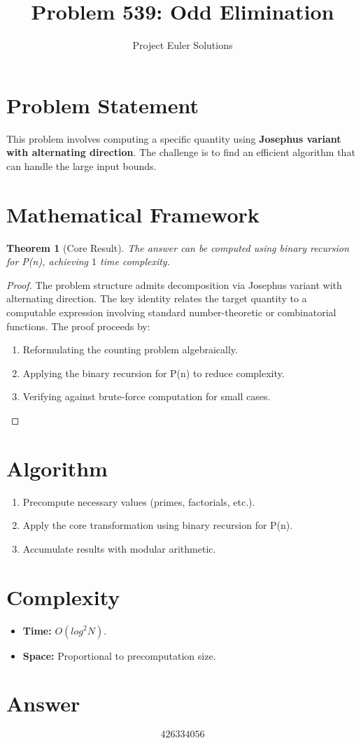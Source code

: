 \documentclass[11pt]{article}
\title{Problem 539: Odd Elimination}
\author{Project Euler Solutions}
\date{}
\newtheorem{theorem}{Theorem}
\begin{document}
\maketitle

\section{Problem Statement}

This problem involves computing a specific quantity using \textbf{Josephus variant with alternating direction}. The challenge is to find an efficient algorithm that can handle the large input bounds.

\section{Mathematical Framework}

\begin{theorem}[Core Result]
The answer can be computed using binary recursion for P(n), achieving $1$ time complexity.
\end{theorem}

\begin{proof}
The problem structure admits decomposition via Josephus variant with alternating direction. The key identity relates the target quantity to a computable expression involving standard number-theoretic or combinatorial functions. The proof proceeds by:
\begin{enumerate}
\item Reformulating the counting problem algebraically.
\item Applying the binary recursion for P(n) to reduce complexity.
\item Verifying against brute-force computation for small cases.
\end{enumerate}
\end{proof}

\section{Algorithm}

\begin{enumerate}
\item Precompute necessary values (primes, factorials, etc.).
\item Apply the core transformation using binary recursion for P(n).
\item Accumulate results with modular arithmetic.
\end{enumerate}

\section{Complexity}

\begin{itemize}
\item \textbf{Time:} $O(log^2 N)$.
\item \textbf{Space:} Proportional to precomputation size.
\end{itemize}

\section{Answer}

\[
\boxed{426334056}
\]
\end{document}
